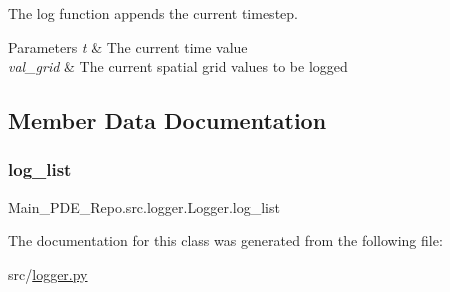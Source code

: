The log function appends the current timestep. 


\begin{DoxyParams}{Parameters}
{\em t} & The current time value \\
\hline
{\em val\+\_\+grid} & The current spatial grid values to be logged \\
\hline
\end{DoxyParams}


\subsection{Member Data Documentation}
\mbox{\label{classMain__PDE__Repo_1_1src_1_1logger_1_1Logger_a159655c83565fd1bfbbabb470ea7da0f}} 
\subsubsection{\texorpdfstring{log\+\_\+list}{log\_list}}
{\footnotesize\ttfamily Main\+\_\+\+P\+D\+E\+\_\+\+Repo.\+src.\+logger.\+Logger.\+log\+\_\+list}



The documentation for this class was generated from the following file\+:\begin{DoxyCompactItemize}
\item 
src/\hyperlink{logger_8py}{logger.\+py}\end{DoxyCompactItemize}
